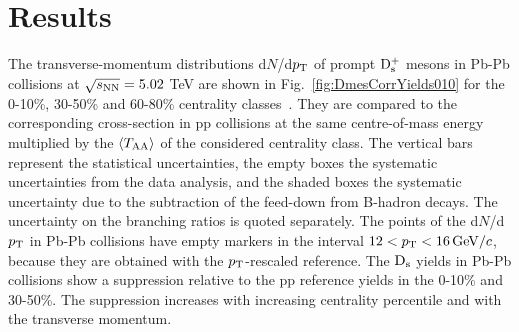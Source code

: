 \section{Results}
\label{sec:PbPbResults}
The transverse-momentum distributions d$N$/d$p_{\rm T}$ of prompt ${\rm D_s^+}$ mesons in Pb-Pb
collisions at $\sqrt{s_{\rm NN}}=5.02$ TeV are shown in Fig.~\ref{fig:DmesCorrYields010}
for the 0-10\%, 30-50\% and 60-80\% centrality classes~\cite{ALICE-PUBLIC-2017-003}. 
They are compared to the corresponding cross-section in pp collisions at the same centre-of-mass energy
multiplied by the $\langle T_{\rm AA} \rangle$ of the considered centrality class.
The vertical bars represent the statistical uncertainties, the empty boxes
the systematic uncertainties from the data analysis, and the shaded boxes
the systematic uncertainty due to the subtraction of the feed-down from 
B-hadron decays. The uncertainty on the branching ratios is quoted separately.
The points of the d$N$/d$p_{\rm T}$ in Pb-Pb collisions have empty markers in the interval $12 < p_{\rm T} < 16 \, \mathrm{GeV}/c$,
because they are obtained with the $p_{\rm T}$-rescaled reference.
The ${\rm D_s}$ yields in Pb-Pb collisions show a suppression relative to the pp reference
yields in the 0-10\% and 30-50\%. The suppression increases with increasing centrality percentile
and with the transverse momentum.\\
